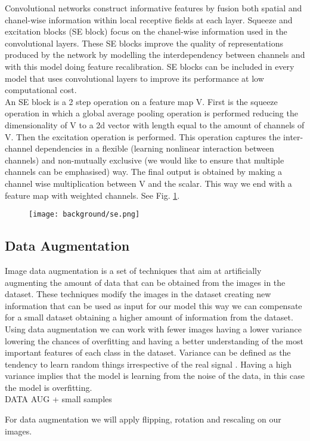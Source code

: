 Convolutional networks construct informative features by fusion both spatial and chanel-wise information within local receptive fields at each layer. Squeeze and excitation blocks (SE block) \cite{senet} focus on the chanel-wise information used in the convolutional layers. These SE blocks improve the quality of representations produced by the network by modelling the interdependency between channels and with this model doing feature recalibration. SE blocks can be included in every model that uses convolutional layers to improve its performance at low computational cost. \\

An SE block is a 2 step operation on a feature map V. First is the squeeze operation in which a global average pooling operation is performed reducing the dimensionality of V to a 2d vector with length equal to the amount of channels of V. Then the excitation operation is performed. This operation captures the inter-channel dependencies in a flexible (learning nonlinear interaction between channels) and non-mutually exclusive (we would like to ensure that multiple channels can be emphasised) way. The final output is obtained by making a channel wise multiplication between V and the scalar. This way we end with a feature map with weighted channels. See Fig. \ref{figure:background:se}. \\

\begin{figure}[H]
    \centering
    \texttt{[image: background/se.png]}
    \caption{}
    \label{figure:background:se}
\end{figure}

\subsection{Data Augmentation}

Image data augmentation is a set of techniques that aim at artificially augmenting the amount of data that can be obtained from the images in the dataset.  These techniques modify the images in the dataset creating new information that can be used as input for our model this way we can compensate for a small dataset obtaining a higher amount of information from the dataset. \\

Using data augmentation we can work with fewer images having a lower variance lowering the chances of overfitting and having a better understanding of the most important features of each class in the dataset. Variance can be defined as the tendency to learn random things irrespective of the real signal \cite{data_augmentation}.  Having a high variance implies that the model is learning from the noise of the data, in this case the model is overfitting. \\

DATA AUG + small samples

For data augmentation we will apply flipping, rotation and rescaling on our images.